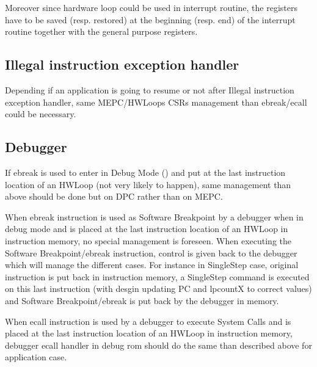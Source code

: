 \documentclass[letterpaper,10pt,english]{sphinxmanual}
\begin{document}
\sphinxAtStartPar
Moreover since hardware loop could be used in interrupt routine, the registers have to be saved (resp. restored) at the beginning (resp. end) of the interrupt routine together with the general purpose registers.


\subsection{Illegal instruction exception handler}
\label{\detokenize{corev_hw_loop:illegal-instruction-exception-handler}}
\sphinxAtStartPar
Depending if an application is going to resume or not after Illegal instruction exception handler, same MEPC/HWLoops CSRs management than ebreak/ecall could be necessary.


\subsection{Debugger}
\label{\detokenize{corev_hw_loop:debugger}}
\sphinxAtStartPar
If ebreak is used to enter in Debug Mode ({\hyperref[\detokenize{debug:ebreak-scenario-2}]{}}) and put at the last instruction location of an HWLoop (not very likely to happen), same management than above should be done but on DPC rather than on MEPC.

\sphinxAtStartPar
When ebreak instruction is used as Software Breakpoint by a debugger when in debug mode and is placed at the last instruction location of an HWLoop in instruction memory, no special management is foreseen.
When executing the Software Breakpoint/ebreak instruction, control is given back to the debugger which will manage the different cases.
For instance in Single\sphinxhyphen{}Step case, original instruction is put back in instruction memory, a Single\sphinxhyphen{}Step command is executed on this last instruction (with desgin updating PC and lpcountX to correct values) and Software Breakpoint/ebreak is put back by the debugger in memory.

\sphinxAtStartPar
When ecall instruction is used by a debugger to execute System Calls and is placed at the last instruction location of an HWLoop in instruction memory, debugger ecall handler in debug rom should do the same than described above for application case.

\sphinxstepscope
\end{document}
